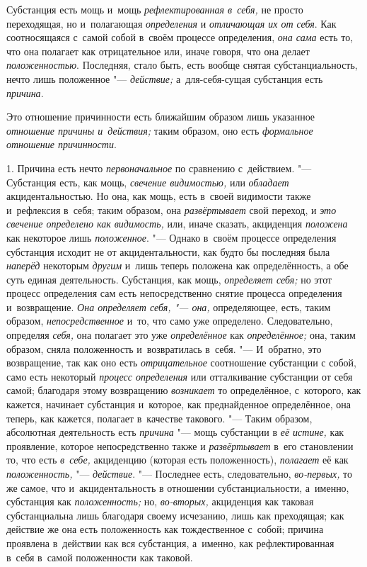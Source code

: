 Субстанция есть мощь и~мощь
{\em рефлектированная в~себя,} не просто переходящая,
но и~полагающая {\em определения} и
{\em отличающая их от себя}. Как соотносящаяся с~самой
собой в~своём процессе определения, {\em она сама} есть
то, что она полагает как отрицательное или, иначе говоря, что она делает
{\em положенностью}. Последняя, стало быть, есть вообще
снятая субстанциальность, нечто лишь положенное
"--- {\em действие;} а~для-себя-сущая субстанция есть {\em причина}.

Это отношение причинности есть ближайшим образом лишь указанное
{\em отношение причины и~действия;} таким образом, оно
есть {\em формальное отношение причинности}.



1. Причина есть нечто {\em первоначальное} по сравнению с~действием. "---
Субстанция есть, как мощь, {\em свечение видимостью,}
или {\em обладает} акцидентальностью. Но она, как мощь,
есть в~своей видимости также и~рефлексия в~себя; таким образом, она
{\em развёртывает} свой переход, и
{\em это свечение определено как видимость,} или, иначе
сказать, акциденция {\em положена} как некоторое лишь
{\em положенное}. "--- Однако в~своём процессе определения
субстанция исходит не от акцидентальности, как будто бы последняя была
{\em наперёд} некоторым {\em другим} и~лишь теперь положена как определённость,
а обе суть единая деятельность. Субстанция, как мощь,
{\em определяет себя;} но этот процесс определения сам
есть непосредственно снятие процесса определения и~возвращение.
{\em Она определяет себя, "--- она,} определяющее, есть,
таким образом, {\em непосредственное} и~то, что само
уже определено. Следовательно, определяя {\em себя,}
она полагает это уже {\em определённое} как
{\em определённое;} она, таким образом, сняла
положенность и~возвратилась в~себя. "--- И~обратно, это возвращение, так как
оно есть {\em отрицательное} соотношение субстанции с
собой, само есть некоторый {\em процесс определения}
или отталкивание субстанции от себя самой; благодаря этому возвращению
{\em возникает} то определённое, с~которого, как
кажется, начинает субстанция и~которое, как преднайденное определённое, она
теперь, как кажется, полагает в~качестве такового. "--- Таким образом,
абсолютная деятельность есть {\em причина} "--- мощь
субстанции в {\em её истине,} как проявление, которое
непосредственно также и {\em развёртывает} в~его
становлении то, что есть {\em в~себе,} акциденцию
(которая есть положенность), {\em полагает} её как {\em положенность,} "---
{\em действие}. "--- Последнее есть, следовательно,
{\em во-первых,} то же самое, что и~акцидентальность в
отношении субстанциальности, а~именно, субстанция как {\em положенность;}
но, {\em во-вторых,} акциденция как таковая субстанциальна
лишь благодаря своему исчезанию, лишь как преходящая; как действие же она
есть положенность как тождественное с~собой; причина проявлена в~действии
как вся субстанция, а~именно, как рефлектированная в~себя в~самой
положенности как таковой.

